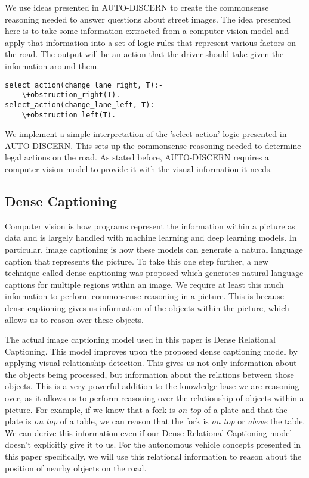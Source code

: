 We use ideas presented in AUTO-DISCERN to create the commonsense reasoning needed to answer questions about street images\cite{kothawade2021autodiscern}. The idea presented here is to take some information extracted from a computer vision model and apply that information into a set of logic rules that represent various factors on the road. The output will be an action that the driver should take given the information around them. 
\begin{verbatim}
select_action(change_lane_right, T):- 
	\+obstruction_right(T).
select_action(change_lane_left, T):- 
	\+obstruction_left(T).
\end{verbatim}
We implement a simple interpretation of the 'select action' logic presented in AUTO-DISCERN. This sets up the commonsense reasoning needed to determine legal actions on the road. As stated before, AUTO-DISCERN requires a computer vision model to provide it with the visual information it needs. 

\subsection{Dense Captioning}
Computer vision is how programs represent the information within a picture as data and is largely handled with machine learning and deep learning models. In particular, image captioning is how these models can generate a natural language caption that represents the picture. To take this one step further, a new technique called dense captioning was proposed which generates natural language captions for multiple regions within an image. We require at least this much information to perform commonsense reasoning in a picture. This is because dense captioning gives us information of the objects within the picture, which allows us to reason over these objects. 

The actual image captioning model used in this paper is Dense Relational Captioning\cite{kim2019dense}. This model improves upon the proposed dense captioning model by applying visual relationship detection. This gives us not only information about the objects being processed, but information about the relations between those objects. This is a very powerful addition to the knowledge base we are reasoning over, as it allows us to perform reasoning over the relationship of objects within a picture. For example, if we know that a fork is \emph{on top} of a plate and that the plate is \emph{on top} of a table, we can reason that the fork is \emph{on top} or \emph{above} the table. We can derive this information even if our Dense Relational Captioning model doesn't explicitly give it to us. For the autonomous vehicle concepts presented in this paper specifically, we will use this relational information to reason about the position of nearby objects on the road.
